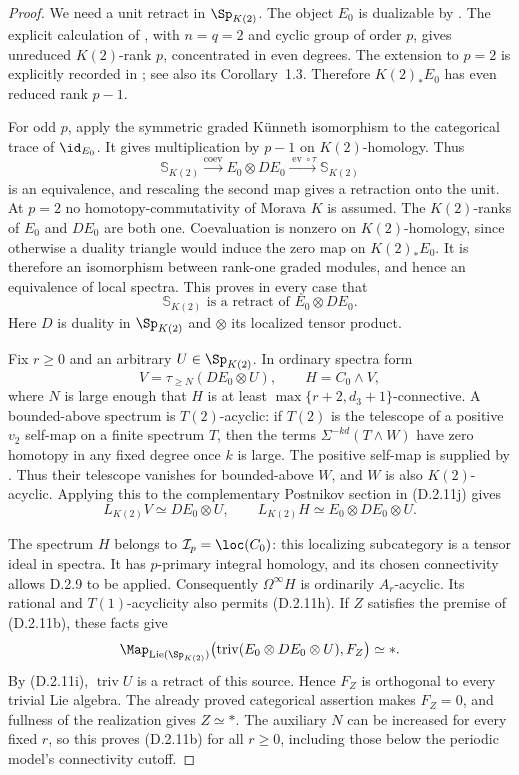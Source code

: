 \begin{proof}
We need a unit retract in $\Sp_{K(2)}$. The object $E_0$ is
dualizable by \cite[Corollary~8.8]{I_HoveyStrickland1999}.
The explicit calculation of
\cite[Theorem~11.1(a)]{I_RavenelWilson1980}, with
$n=q=2$ and cyclic group of order $p$, gives unreduced
$K(2)$-rank $p$, concentrated in even degrees. The extension
to $p=2$ is explicitly recorded in
\cite[Remark~4.4]{I_HopkinsRavenelWilson1998}; see also its
Corollary~1.3. Therefore $K(2)_*E_0$ has even reduced rank
$p-1$.

For odd $p$, apply the symmetric graded K\"unneth isomorphism
to the categorical trace of $\id_{E_0}$. It gives multiplication
by $p-1$ on $K(2)$-homology. Thus
\[
 \mathbb S_{K(2)}\xrightarrow{\operatorname{coev}}
 E_0\otimes DE_0\xrightarrow{\operatorname{ev}\circ\tau}
 \mathbb S_{K(2)}
\]
is an equivalence, and rescaling the second map gives a
retraction onto the unit. At $p=2$ no homotopy-commutativity
of Morava $K$ is assumed. The $K(2)$-ranks of $E_0$ and
$DE_0$ are both one. Coevaluation is nonzero on
$K(2)$-homology, since otherwise a duality triangle would
induce the zero map on $K(2)_*E_0$. It is therefore an
isomorphism between rank-one graded modules, and hence an
equivalence of local spectra. This proves in every case that
\[
 \mathbb S_{K(2)}\text{ is a retract of }E_0\otimes DE_0.
 \tag{D.2.11i}
\]
Here $D$ is duality in $\Sp_{K(2)}$ and $\otimes$ its
localized tensor product.

Fix $r\geq0$ and an arbitrary $U\in\Sp_{K(2)}$. In ordinary
spectra form
\[
 V=\tau_{\geq N}(DE_0\otimes U),\qquad H=C_0\wedge V,
 \tag{D.2.11j}
\]
where $N$ is large enough that $H$ is at least
$\max\{r+2,d_3+1\}$-connective. A bounded-above spectrum
is $T(2)$-acyclic: if $T(2)$ is the telescope of a positive
$v_2$ self-map on a finite spectrum $T$, then the terms
$\Sigma^{-kd}(T\wedge W)$ have zero homotopy in any fixed
degree once $k$ is large. The positive self-map is supplied by
\cite[Theorem~9]{HopkinsSmith1998}. Thus their telescope
vanishes for bounded-above $W$, and $W$ is also
$K(2)$-acyclic. Applying this to the complementary
Postnikov section in \textup{(D.2.11j)} gives
\[
 L_{K(2)}V\simeq DE_0\otimes U,\qquad
 L_{K(2)}H\simeq E_0\otimes DE_0\otimes U.
 \tag{D.2.11k}
\]

The spectrum $H$ belongs to $\mathcal I_p=\loc(C_0)$:
this localizing subcategory is a tensor ideal in spectra.
It has $p$-primary integral homology, and its chosen
connectivity allows D.2.9 to be applied. Consequently
$\Omega^\infty H$ is ordinarily $A_r$-acyclic. Its
rational and $T(1)$-acyclicity also permits
\textup{(D.2.11h)}. If $Z$ satisfies the premise of
\textup{(D.2.11b)}, these facts give
\[
 \Map_{\operatorname{Lie}(\Sp_{K(2)})}
 \bigl(\operatorname{triv}(E_0\otimes DE_0\otimes U),F_Z\bigr)
 \simeq *.
\]
By \textup{(D.2.11i)}, $\operatorname{triv}U$ is a retract
of this source. Hence $F_Z$ is orthogonal to every trivial
Lie algebra. The already proved categorical assertion makes
$F_Z=0$, and fullness of the realization gives $Z\simeq *$.
The auxiliary $N$ can be increased for every fixed $r$, so
this proves \textup{(D.2.11b)} for all $r\geq0$, including
those below the periodic model's connectivity cutoff.


\end{proof}
